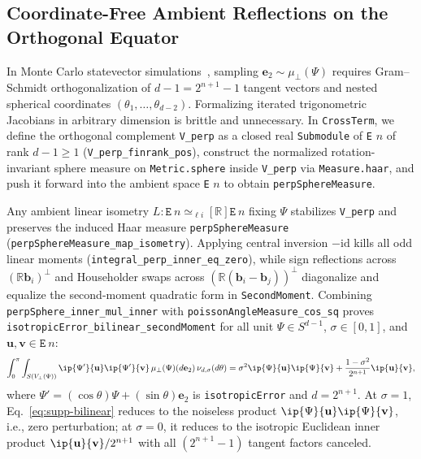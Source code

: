 \subsection{Coordinate-Free Ambient Reflections on the Orthogonal Equator}
\label{sec:supp-reflections}

In Monte Carlo statevector simulations~\cite{SahaRoyLacalle2026}, sampling $\mathbf{e}_2 \sim \mu_\perp(\Psi)$ requires Gram--Schmidt orthogonalization of $d - 1 = 2^{n+1} - 1$ tangent vectors and nested spherical coordinates $(\theta_1, \dots, \theta_{d-2})$. Formalizing iterated trigonometric Jacobians in arbitrary dimension is brittle and unnecessary. In \texttt{CrossTerm}, we define the orthogonal complement \texttt{V\_perp} as a closed real \texttt{Submodule} of \texttt{E} $n$ of rank $d - 1 \ge 1$ (\texttt{V\_perp\_finrank\_pos}), construct the normalized rotation-invariant sphere measure on \texttt{Metric.sphere} inside \texttt{V\_perp} via \texttt{Measure.haar}, and push it forward into the ambient space \texttt{E} $n$ to obtain \texttt{perpSphereMeasure}.

{\setlength{\emergencystretch}{4.5em}%
Any ambient linear isometry $L : \texttt{E}\ n \simeq_{\ell i}[\mathbb{R}] \texttt{E}\ n$ fixing $\Psi$ stabilizes \texttt{V\_perp} and preserves the induced Haar measure \texttt{perpSphereMeasure} (\texttt{perpSphereMeasure\_map\_isometry}). Applying central inversion $-\mathrm{id}$ kills all odd linear moments (\texttt{integral\_perp\_inner\_eq\_zero}), while sign reflections across $(\mathbb{R}\mathbf{b}_i)^\perp$ and Householder swaps across $(\mathbb{R}(\mathbf{b}_i - \mathbf{b}_j))^\perp$ diagonalize and equalize the second-moment quadratic form in \texttt{SecondMoment}. Combining \texttt{perpSphere\_inner\_mul\_inner} with \texttt{poissonAngleMeasure\_cos\_sq} proves \texttt{isotropicError\_bilinear\_secondMoment} for all unit $\Psi \in S^{d-1}$, $\sigma \in [0, 1]$, and $\mathbf{u}, \mathbf{v} \in \texttt{E}\ n$:
\begin{equation}
\int_0^\pi \int_{S(V_\perp(\Psi))} \ip{\Psi'}{\mathbf{u}}\ip{\Psi'}{\mathbf{v}}\,\mu_\perp(\Psi)(d\mathbf{e}_2)\,\nu_{d,\sigma}(d\theta) = \sigma^2 \ip{\Psi}{\mathbf{u}}\ip{\Psi}{\mathbf{v}} + \frac{1 - \sigma^2}{2^{n+1}}\ip{\mathbf{u}}{\mathbf{v}},
\label{eq:supp-bilinear}
\end{equation}
where $\Psi' = (\cos\theta)\Psi + (\sin\theta)\mathbf{e}_2$ is \texttt{isotropicError} and $d = 2^{n+1}$. At $\sigma = 1$, Eq.~\eqref{eq:supp-bilinear} reduces to the noiseless product $\ip{\Psi}{\mathbf{u}}\ip{\Psi}{\mathbf{v}}$, i.e., zero perturbation; at $\sigma = 0$, it reduces to the isotropic Euclidean inner product $\ip{\mathbf{u}}{\mathbf{v}} / 2^{n+1}$ with all $(2^{n+1} - 1)$ tangent factors canceled.\par}

